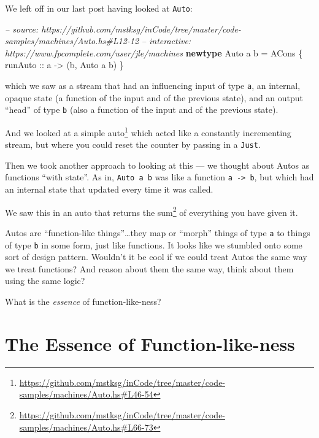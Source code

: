 \documentclass[]{article}
\newenvironment{Shaded}{}{}
\newcommand{\KeywordTok}[1]{\textcolor[rgb]{0.00,0.44,0.13}{\textbf{{#1}}}}
\newcommand{\DataTypeTok}[1]{\textcolor[rgb]{0.56,0.13,0.00}{{#1}}}
\newcommand{\CommentTok}[1]{\textcolor[rgb]{0.38,0.63,0.69}{\textit{{#1}}}}
\newcommand{\OtherTok}[1]{\textcolor[rgb]{0.00,0.44,0.13}{{#1}}}
\newcommand{\FunctionTok}[1]{\textcolor[rgb]{0.02,0.16,0.49}{{#1}}}
\newcommand{\NormalTok}[1]{{#1}}
\renewcommand{\href}[2]{#2\footnote{\url{#1}}}
\begin{document}
We left off in our last post having looked at \texttt{Auto}:

\begin{Shaded}
\begin{Highlighting}[]
\CommentTok{-- source: https://github.com/mstksg/inCode/tree/master/code-samples/machines/Auto.hs#L12-12}
\CommentTok{-- interactive: https://www.fpcomplete.com/user/jle/machines}
\KeywordTok{newtype} \DataTypeTok{Auto} \NormalTok{a b }\FunctionTok{=} \DataTypeTok{ACons} \NormalTok{\{}\OtherTok{ runAuto ::} \NormalTok{a }\OtherTok{->} \NormalTok{(b, }\DataTypeTok{Auto} \NormalTok{a b) \}}
\end{Highlighting}
\end{Shaded}

which we saw as a stream that had an influencing input of type \texttt{a}, an
internal, opaque state (a function of the input and of the previous state), and
an output ``head'' of type \texttt{b} (also a function of the input and of the
previous state).

And we looked at
\href{https://github.com/mstksg/inCode/tree/master/code-samples/machines/Auto.hs\#L46-54}{a
simple auto} which acted like a constantly incrementing stream, but where you
could reset the counter by passing in a \texttt{Just}.

Then we took another approach to looking at this --- we thought about Autos as
functions ``with state''. As in, \texttt{Auto\ a\ b} was like a function
\texttt{a\ -\textgreater{}\ b}, but which had an internal state that updated
every time it was called.

We saw this in an auto that
\href{https://github.com/mstksg/inCode/tree/master/code-samples/machines/Auto.hs\#L66-73}{returns
the sum} of everything you have given it.

Autos are ``function-like things''\ldots{}they map or ``morph'' things of type
\texttt{a} to things of type \texttt{b} in some form, just like functions. It
looks like we stumbled onto some sort of design pattern. Wouldn't it be cool if
we could treat Autos the same way we treat functions? And reason about them the
same way, think about them using the same logic?

What is the \emph{essence} of function-like-ness?

\section{The Essence of
Function-like-ness}\label{the-essence-of-function-like-ness}
\end{document}
